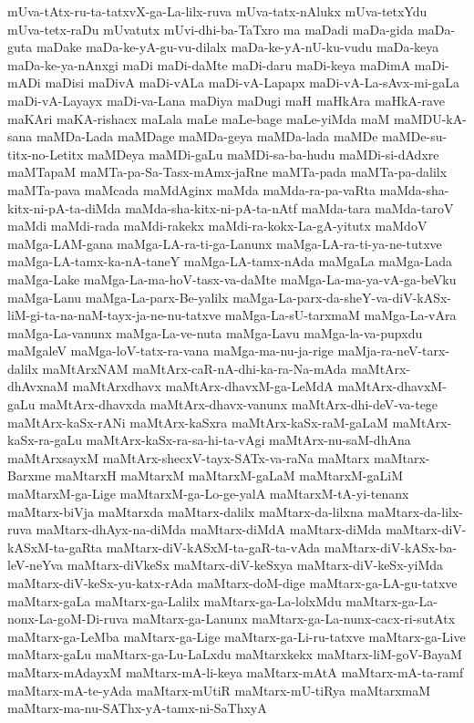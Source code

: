 {mUva-tAtx-ru-ta-tatxvX-ga-La-lilx-ruva
mUva-tatx-nAlukx
mUva-tetxYdu
mUva-tetx-raDu
mUvatutx
mUvi-dhi-ba-TaTxro
ma
maDadi
maDa-gida
maDa-guta
maDake
maDa-ke-yA-gu-vu-dilalx
maDa-ke-yA-nU-ku-vudu
maDa-keya
maDa-ke-ya-nAnxgi
maDi
maDi-daMte
maDi-daru
maDi-keya
maDimA
maDi-mADi
maDisi
maDivA
maDi-vALa
maDi-vA-Lapapx
maDi-vA-La-sAvx-mi-gaLa
maDi-vA-Layayx
maDi-va-Lana
maDiya
maDugi
maH
maHkAra
maHkA-rave
maKAri
maKA-rishacx
maLala
maLe
maLe-bage
maLe-yiMda
maM
maMDU-kA-sana
maMDa-Lada
maMDage
maMDa-geya
maMDa-lada
maMDe
maMDe-su-titx-no-Letitx
maMDeya
maMDi-gaLu
maMDi-sa-ba-hudu
maMDi-si-dAdxre
maMTapaM
maMTa-pa-Sa-Tasx-mAmx-jaRne
maMTa-pada
maMTa-pa-dalilx
maMTa-pava
maMcada
maMdAginx
maMda
maMda-ra-pa-vaRta
maMda-sha-kitx-ni-pA-ta-diMda
maMda-sha-kitx-ni-pA-ta-nAtf
maMda-tara
maMda-taroV
maMdi
maMdi-rada
maMdi-rakekx
maMdi-ra-kokx-La-gA-yitutx
maMdoV
maMga-LAM-gana
maMga-LA-ra-ti-ga-Lanunx
maMga-LA-ra-ti-ya-ne-tutxve
maMga-LA-tamx-ka-nA-taneY
maMga-LA-tamx-nAda
maMgaLa
maMga-Lada
maMga-Lake
maMga-La-ma-hoV-tasx-va-daMte
maMga-La-ma-ya-vA-ga-beVku
maMga-Lanu
maMga-La-parx-Be-yalilx
maMga-La-parx-da-sheY-va-diV-kASx-liM-gi-ta-na-naM-tayx-ja-ne-nu-tatxve
maMga-La-sU-tarxmaM
maMga-La-vAra
maMga-La-vanunx
maMga-La-ve-nuta
maMga-Lavu
maMga-la-va-pupxdu
maMgaleV
maMga-loV-tatx-ra-vana
maMga-ma-nu-ja-rige
maMja-ra-neV-tarx-dalilx
maMtArxNAM
maMtArx-caR-nA-dhi-ka-ra-Na-mAda
maMtArx-dhAvxnaM
maMtArxdhavx
maMtArx-dhavxM-ga-LeMdA
maMtArx-dhavxM-gaLu
maMtArx-dhavxda
maMtArx-dhavx-vanunx
maMtArx-dhi-deV-va-tege
maMtArx-kaSx-rANi
maMtArx-kaSxra
maMtArx-kaSx-raM-gaLaM
maMtArx-kaSx-ra-gaLu
maMtArx-kaSx-ra-sa-hi-ta-vAgi
maMtArx-nu-saM-dhAna
maMtArxsayxM
maMtArx-shecxV-tayx-SATx-va-raNa
maMtarx
maMtarx-Barxme
maMtarxH
maMtarxM
maMtarxM-gaLaM
maMtarxM-gaLiM
maMtarxM-ga-Lige
maMtarxM-ga-Lo-ge-yalA
maMtarxM-tA-yi-tenanx
maMtarx-biVja
maMtarxda
maMtarx-dalilx
maMtarx-da-lilxna
maMtarx-da-lilx-ruva
maMtarx-dhAyx-na-diMda
maMtarx-diMdA
maMtarx-diMda
maMtarx-diV-kASxM-ta-gaRta
maMtarx-diV-kASxM-ta-gaR-ta-vAda
maMtarx-diV-kASx-ba-leV-neYva
maMtarx-diVkeSx
maMtarx-diV-keSxya
maMtarx-diV-keSx-yiMda
maMtarx-diV-keSx-yu-katx-rAda
maMtarx-doM-dige
maMtarx-ga-LA-gu-tatxve
maMtarx-gaLa
maMtarx-ga-Lalilx
maMtarx-ga-La-lolxMdu
maMtarx-ga-La-nonx-La-goM-Di-ruva
maMtarx-ga-Lanunx
maMtarx-ga-La-nunx-cacx-ri-sutAtx
maMtarx-ga-LeMba
maMtarx-ga-Lige
maMtarx-ga-Li-ru-tatxve
maMtarx-ga-Live
maMtarx-gaLu
maMtarx-ga-Lu-LaLxdu
maMtarxkekx
maMtarx-liM-goV-BayaM
maMtarx-mAdayxM
maMtarx-mA-li-keya
maMtarx-mAtA
maMtarx-mA-ta-ramf
maMtarx-mA-te-yAda
maMtarx-mUtiR
maMtarx-mU-tiRya
maMtarxmaM
maMtarx-ma-nu-SAThx-yA-tamx-ni-SaThxyA
}
